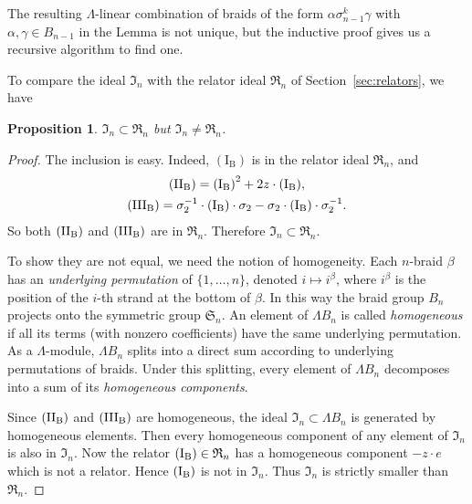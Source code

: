 \documentclass[12pt]{amsart}
\newtheorem{prop}[thm]{Proposition}
\theoremstyle{definition}
\theoremstyle{remark}
\begin{document}
The resulting $\Lambda$-linear combination of braids of the form
$\alpha\sigma_{n-1}^k \gamma$ with $\alpha,\gamma\in B_{n-1}$ in the Lemma is not unique,
but the inductive proof gives us a recursive algorithm to find one.

To compare the ideal $\mathfrak I_n$ with the relator ideal $\mathfrak R_n$ of Section~\ref{sec:relators}, we have

\begin{prop}
$\mathfrak I_n\subset \mathfrak R_n$ but
$\mathfrak I_n\neq \mathfrak R_n$.
\end{prop}

\begin{proof}
The inclusion is easy.
Indeed, $(\text{I}_\text{B})$ is in the relator ideal $\mathfrak R_n$, and
\begin{gather*}
\text{\rm(II$_\text{B}$)}=
\text{\rm(I$_\text{B}$)}^2 +2z\cdot \text{\rm(I$_\text{B}$)} ,
\\
\text{\rm(III$_\text{B}$)}=
\sigma_2^{-1}\cdot \text{\rm(I$_\text{B}$)} \cdot\sigma_2 -\sigma_2\cdot\text{\rm(I$_\text{B}$)} \cdot\sigma_2^{-1} .
\end{gather*}
So both $\text{\rm(II$_\text{B}$)}$ and $\text{\rm(III$_\text{B}$)}$ are in $\mathfrak R_n$.
Therefore $\mathfrak I_n\subset \mathfrak R_n$.

To show they are not equal, we need the notion of homogeneity.
Each $n$-braid $\beta$ has an \emph{underlying permutation} of $\{1,\dots,n\}$, denoted $i\mapsto i^{\beta}$,
where $i^{\beta}$ is the position of the $i$-th strand at the bottom of $\beta$.
In this way the braid group $B_n$ projects onto the symmetric group $\mathfrak S_n$.
An element of $\Lambda B_n$ is called \emph{homogeneous} if all its terms
(with nonzero coefficients) have the same underlying permutation.
As a $\Lambda$-module, $\Lambda B_n$ splits into a direct sum
according to underlying permutations of braids.
Under this splitting, every element of $\Lambda B_n$ decomposes into a sum of its
\emph{homogeneous components}.

Since $\text{\rm(II$_\text{B}$)}$ and $\text{\rm(III$_\text{B}$)}$ are homogeneous,
the ideal $\mathfrak I_n\subset\Lambda B_n$ is generated by homogeneous elements.
Then every homogeneous component of any element of $\mathfrak I_n$ is also in $\mathfrak I_n$.
Now the relator $\text{\rm(I$_\text{B}$)}\in \mathfrak R_n$ has a homogeneous component $-z\cdot e$
which is not a relator.
Hence $\text{\rm(I$_\text{B}$)}$ is not in $\mathfrak I_n$.
Thus $\mathfrak I_n$ is strictly smaller than $\mathfrak R_n$.
\end{proof}
\end{document}
